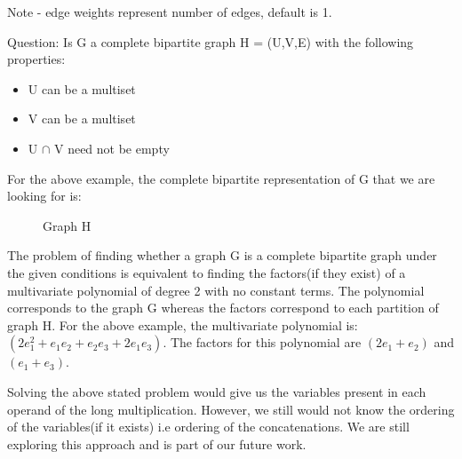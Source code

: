 Note - edge weights represent number of edges, default is 1.

\newpage

Question: Is G a complete bipartite graph H = (U,V,E) with the following properties:

\begin{itemize}
\item U can be a multiset
\item V can be a multiset
\item U $\cap$ V need not be empty
\end{itemize}

For the above example, the complete bipartite representation of G that we are looking for is: 
\begin{figure}[h]

\begin{center}

\caption{Graph H}

\end{center}
\end{figure}

The problem of finding whether a graph G is a complete bipartite graph under the given conditions is equivalent to finding the factors(if they exist) of a multivariate polynomial of degree 2 with no constant terms. The polynomial corresponds to the graph G whereas the factors correspond to each partition of graph H. For the above example, the multivariate polynomial is:
$(2 e_1^2 + e_1e_2 + e_2e_3 + 2 e_1e_3)$. The factors for this polynomial are $(2 e_1 + e_2)$ and $(e_1 + e_3)$.

Solving the above stated problem would give us the variables present in each operand of the long multiplication. However, we still would not know the ordering of the variables(if it exists) i.e ordering of the concatenations. We are still exploring this approach and is part of our future work.
